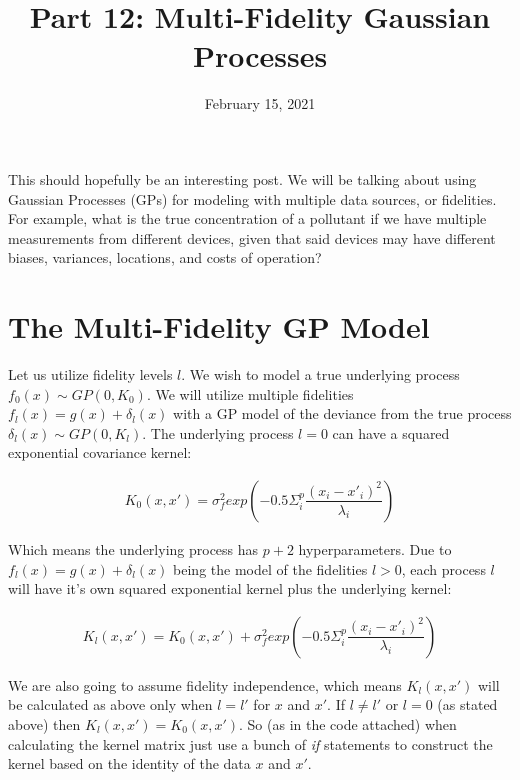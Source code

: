 \documentclass[12pt]{article}
\title{\textbf{Part 12: Multi-Fidelity Gaussian Processes}}
\begin{document}
\date{February 15, 2021}
\maketitle

This should hopefully be an interesting post. We will be talking about using Gaussian Processes (GPs) for modeling with multiple data sources, or fidelities. For example, what is the true concentration of a pollutant if we have multiple measurements from different devices, given that said devices may have different biases,  variances, locations, and costs of operation?

\section{The Multi-Fidelity GP Model}

Let us utilize fidelity levels $l$. We wish to model a true underlying process $f_0(x) \sim GP(0,K_0)$. We will utilize multiple fidelities $f_l(x) = g(x) + \delta_l(x)$ with a GP model of the deviance from the true process $\delta_l(x) \sim GP(0,K_l)$. The underlying process $l=0$ can have a squared exponential covariance kernel:

\begin{align*}
K_0(x,x') = \sigma_f^2exp(-0.5\Sigma_i^p\dfrac{(x_{i}-x'_{i})^2}{\lambda_{i}})
\end{align*}

\vspace{5mm}

Which means the underlying process has $p+2$ hyperparameters. Due to $f_l(x) = g(x) + \delta_l(x)$ being the model of the fidelities $l>0$, each process $l$ will have it's own squared exponential kernel plus the underlying kernel:

\begin{align*}
K_l(x,x') = K_0(x,x') + \sigma_f^2exp(-0.5\Sigma_i^p\dfrac{(x_{i}-x'_{i})^2}{\lambda_{i}})
\end{align*}

\vspace{5mm}

We are also going to assume fidelity independence, which means $K_l(x,x')$ will be calculated as above only when $l=l'$ for $x$ and $x'$. If $l \neq l'$ or $l=0$ (as stated above) then $K_l(x,x') = K_0(x,x')$. So (as in the code attached) when calculating the kernel matrix just use a bunch of \emph{if} statements to construct the kernel based on the identity of the data $x$ and $x'$.
\end{document}
